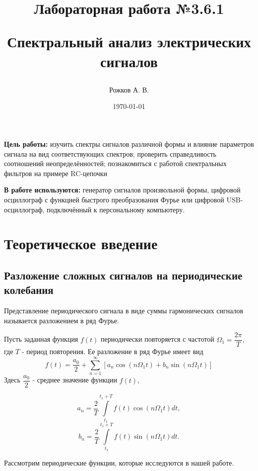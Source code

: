 \documentclass[a4paper, 12pt]{article}
\title{\begin{center}Лабораторная работа №3.6.1\end{center}
Спектральный анализ электрических сигналов}
\author{Рожков А. В.}
\date{\today}
\begin{document}
    \maketitle
    \newpage

    \textbf{Цель работы:} изучить спектры сигналов различной формы и влияние параметров сигнала на вид соответствующих спектров; проверить справедливость соотношений неопределённостей; познакомиться с работой спектральных фильтров на примере RC-цепочки

    \textbf{В работе используются:} генератор сигналов произвольной формы, цифровой осциллограф с функцией быстрого преобразования Фурье или цифровой USB-осциллограф, подключённый к персональному компьютеру.

    \section{Теоретическое введение}

        \subsection{Разложение сложных сигналов на периодические колебания}
            Представление периодического сигнала в виде суммы гармонических сигналов называется разложением в ряд Фурье.

	        Пусть заданная функция $f(t)$ периодически повторяется с частотой $\Omega_{1}=\dfrac{2\pi}{T},$ где $T$ - период повторения. Ее разложение в ряд Фурье имеет вид
            \begin{equation}
                f(t)=\dfrac{a_{0}}{2}+ \sum\limits_{n=1}^\infty [a_{n}\cos(n \Omega_{1}t)+b_{n}\sin(n \Omega_{1} t) ]
                \label{eq1}
            \end{equation}
		    Здесь $\dfrac{a_{0}}{2}$ - среднее значение функции $f(t)$,

            \begin{equation}
                a_{n}=\dfrac{2}{T}\int\limits_{t_{1}}^{t_{1}+T}f(t)\cos(n \Omega_{1} t)dt,
                \label{eq2}
            \end{equation}
            \begin{equation}
                b_{n}=\dfrac{2}{T}\int\limits_{t_{1}}^{t_{1}+T}f(t)\sin(n \Omega_{1} t)dt.
                \label{eq3}
            \end{equation}

	        Рассмотрим периодические функции, которые исследуются в нашей работе.
\end{document}
